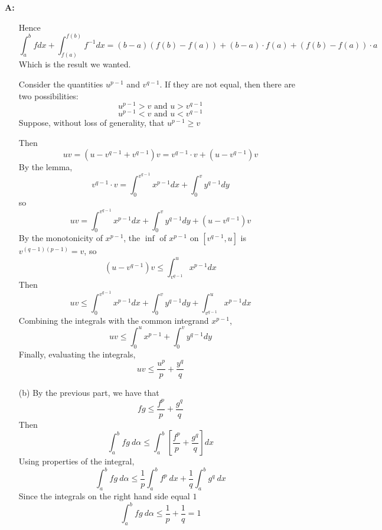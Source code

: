 \documentclass{article}
\newenvironment{Answer} {\par\noindent\textbf{A:}} {}
\begin{document}
\begin{Answer}
\begin{itemize}
        Hence
        \[\int_a^b f dx + \int_{f(a)}^{f(b)} f^{-1} dx = (b-a)(f(b)-f(a)) + (b-a)\cdot f(a) + (f(b) - f(a))\cdot a\]
        Which is the result we wanted.

            Consider the quantities $u^{p-1}$ and $v^{q-1}$. If they are not equal, then there are two possibilities:
            \[u^{p-1} > v \text{ and } u > v^{q-1}\]
            \[u^{p-1} < v \text{ and } u < v^{q-1}\]
        Suppose, without loss of generality, that $u^{p-1} \geq v$

        Then 
        \[ uv = (u - v^{q-1} + v^{q-1}) v = v^{q-1} \cdot v + (u-v^{q-1})v\] 
        By the lemma,
        \[v^{q-1} \cdot v = \int_0^{v^{q-1}} x^{p-1} dx + \int_0^v y^{q-1} dy\]
        so
        \[uv = \int_0^{v^{q-1}} x^{p-1} dx + \int_0^v y^{q-1} dy + (u - v^{q-1}) v\]
        By the monotonicity of $x^{p-1}$, the $\inf$ of $x^{p-1}$ on $[v^{q-1}, u]$ is $v^{(q-1)(p-1)} = v$, so 
        \[(u - v^{q-1})v \leq \int_{v^{q-1}}^u x^{p-1}dx\]
        Then 
        \[uv \leq \int_0^{v^{q-1}} x^{p-1} dx + \int_0^v y^{q-1} dy + \int_{v^{q-1}}^u x^{p-1} dx\] 
        Combining the integrals with the common integrand $x^{p-1}$,
        \[uv \leq \int_0^u x^{p-1} + \int_0^v y^{q-1} dy\]
        Finally, evaluating the integrals,
        \[uv \leq \frac{u^p}{p} + \frac{y^q}{q}\]

    \item[(b)]
        By the previous part, we have that
        \[fg \leq \frac{f^p}{p} + \frac{g^q}{q}\]
        Then
        \[\int_a^b fg \: d\alpha \leq \int_a^b \left[\frac{f^p}{p} + \frac{g^q}{q}\right]dx\]
        Using properties of the integral,
        \[\int_a^b fg \: d\alpha \leq \frac{1}{p} \int_a^b f^p \: dx + \frac{1}{q}\int_a^b g^q \: dx\]
        Since the integrals on the right hand side equal $1$
        \[\int_a^b fg \: d\alpha \leq \frac{1}{p} + \frac{1}{q} = 1\]


\end{itemize}
\end{Answer}
\end{document}
